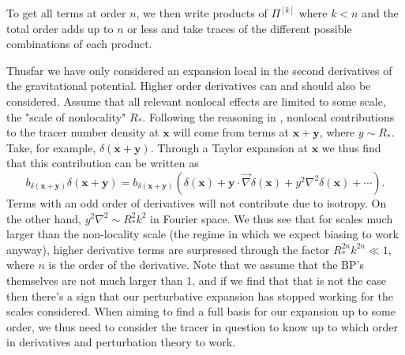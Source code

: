 \documentclass[11pt]{book}
\DeclareRobustCommand{\d}{\ifmmode\text{d}\else d\fi}
\newcommand{\br}[1]{\ensuremath{\left( #1 \right)}}
\newcommand{\sbr}[1]{\ensuremath{\left[ #1 \right]}}
\begin{document}
To get all terms at order $n$, we then write products of $\Pi^{[k]}$ where $k<n$ and the total order adds up to $n$ or less and take traces of the different possible combinations of each product. %

Thusfar we have only considered an expansion local in the second derivatives of the gravitational potential. Higher order derivatives can and should also be considered. Assume that all relevant nonlocal effects are limited to some scale, the "scale of nonlocality" $R_*$. Following the reasoning in \cite{Schmidt2013_clustering}, nonlocal contributions to the tracer number density at $\mathbf x$ will come from terms at $\mathbf x + \mathbf y$, where $y \sim R_*$. Take, for example, $\delta(\mathbf x + \mathbf y)$. Through a Taylor expansion at $\mathbf x$ we thus find that this contribution can be written as
$$
b_{\delta(\mathbf x + \mathbf y)}\delta(\mathbf x+\mathbf y) = b_{\delta(\mathbf x + \mathbf y)}(\delta(\mathbf x) + \mathbf y \cdot\vec \nabla \delta(\mathbf x) + y^2\nabla^2\delta(\mathbf x) + \cdots).
$$
Terms with an odd order of derivatives will not contribute due to isotropy. On the other hand, $y^2\nabla^2\sim R_*^2 k^2$ in Fourier space. We thus see that for scales much larger than the non-locality scale (the regime in which we expect biasing to work anyway), higher derivative terms are surpressed through the factor $R_*^{2n}k^{2n}\ll 1$, where $n$ is the order of the derivative. Note that we assume that the BP's themselves are not much larger than 1, and if we find that that is not the case then there's a sign that our perturbative expansion has stopped working for the scales considered. When aiming to find a full basis for our expansion up to some order, we thus need to consider the tracer in question to know up to which order in derivatives and perturbation theory to work. %

\end{document}
